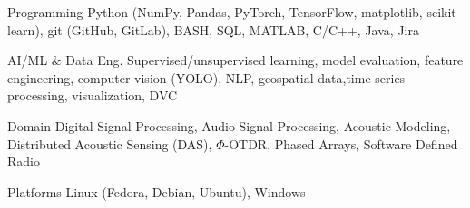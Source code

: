 

\begin{cvskills}

  \cvskill
    {Programming} %
    {Python (NumPy, Pandas, PyTorch, TensorFlow, matplotlib, scikit-learn), git (GitHub, GitLab), BASH, SQL, MATLAB, C/C++, \newline Java, Jira}


  \cvskill
    {AI/ML \& Data Eng.} %
    {Supervised/unsupervised learning, model evaluation, feature engineering, computer vision (YOLO), NLP, geospatial data,\newline time-series processing, visualization, DVC} %


  \cvskill
    {Domain} %
    {Digital Signal Processing, Audio Signal Processing, Acoustic Modeling, Distributed Acoustic Sensing (DAS), $\Phi$-OTDR, \newline Phased Arrays, Software Defined Radio} %


  \cvskill
    {Platforms} %
    {Linux (Fedora, Debian, Ubuntu), Windows}

\end{cvskills}
